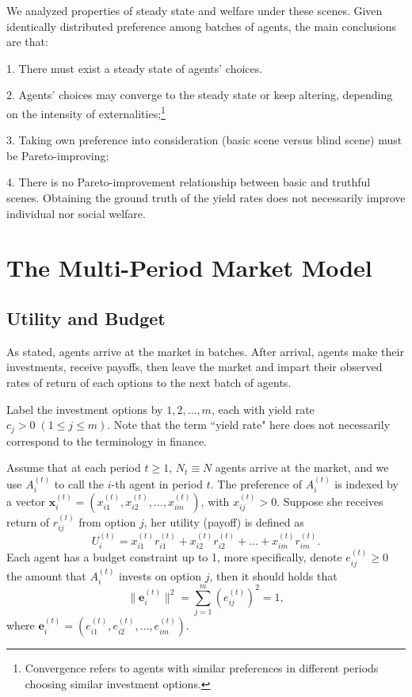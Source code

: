 \documentclass[12pt,english]{article}
\theoremstyle{plain}
\theoremstyle{plain}
\begin{document}
	We analyzed properties of steady state and welfare under these scenes. Given identically distributed preference among batches of agents, the main conclusions are that:\par
	1. There must exist a steady state of agents' choices.\par 
	2. Agents' choices may converge to the steady state or keep altering, depending on the intensity of externalities;\footnote{Convergence refers to agents with similar preferences in different periods choosing similar investment options.}\par
	3. Taking own preference into consideration (basic scene versus blind scene) must be Pareto-improving;\par
	4. There is no Pareto-improvement relationship between basic and truthful scenes. Obtaining the ground truth of the yield rates does not necessarily improve individual nor social welfare.\par
	
	
	\section{The Multi-Period Market Model}
	\subsection{Utility and Budget}
	As stated, agents arrive at the market in batches. After arrival, agents make their investments, receive payoffs, then leave the market and impart their observed rates of return of each options to the next batch of agents. \par
	
	Label the investment options by $1, 2, \dots, m$, each with yield rate $c_j > 0\;(1\leqslant j \leqslant m)$. Note that the term ``yield rate" here does not necessarily correspond to the terminology in finance.\par 
	
	Assume that at each period $t\geqslant 1$, $N_t \equiv N$ agents arrive at the market, and we use $A_i^{(t)}$ to call the $i$-th agent in period $t$. The preference of $A_i^{(t)}$ is indexed by a vector $\mathbf{x}_i^{(t)} = \left(x^{(t)}_{i1}, x^{(t)}_{i2}, \dots, x^{(t)}_{im}\right)$, with $x^{(t)}_{ij} > 0$. Suppose she receives return of $r_{ij}^{(t)}$ from option $j$, her utility (payoff) is defined as
	\begin{equation}
	U_i^{(t)} = x_{i1}^{(t)}r_{i1}^{(t)} + x_{i2}^{(t)}r_{i2}^{(t)} + \dots + x_{im}^{(t)}r_{im}^{(t)}.
	\end{equation}
	Each agent has a budget constraint up to 1, more specifically, denote $e^{(t)}_{ij} \geqslant 0$ the amount that $A_i^{(t)}$ invests on option $j$, then it should holds that
	\begin{equation}
	\lVert\mathbf{e}_i^{(t)}\rVert^2 = \sum_{j = 1}^{m}\left(e^{(t)}_{ij}\right)^2 =1,
	\end{equation}
	where $\mathbf{e}_i^{(t)} = \left(e^{(t)}_{i1}, e^{(t)}_{i2}, \dots, e^{(t)}_{im}\right)$. \par
	
\end{document}
